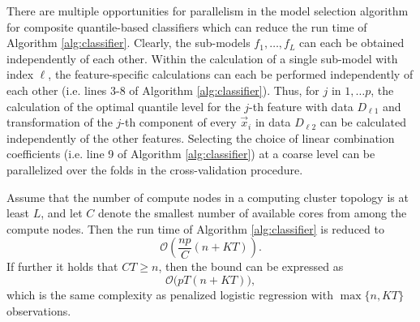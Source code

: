 There are multiple opportunities for parallelism in the model selection
algorithm for composite quantile-based classifiers which can reduce the run time
of Algorithm \ref{alg:classifier}.  Clearly, the sub-models $f_1, \dots, f_L$
can each be obtained independently of each other.  Within the calculation of a
single sub-model with index $\ell$, the feature-specific calculations can each
be performed independently of each other (i.e. lines 3-8 of Algorithm
\ref{alg:classifier}).  Thus, for $j$ in $1, \dots p$, the calculation of the
optimal quantile level for the $j$-th feature with data $D_{\ell 1}$ and
transformation of the $j$-th component of every $\vec{x}_i$ in data $D_{\ell 2}$
can be calculated independently of the other features.  Selecting the choice of
linear combination coefficients (i.e. line 9 of Algorithm \ref{alg:classifier})
at a coarse level can be parallelized over the folds in the cross-validation
procedure.

\begin{proposition}
  \label{cor:parallel-runtime}
  Assume that the number of compute nodes in a computing cluster topology is at
  least $L$, and let $C$ denote the smallest number of available cores from
  among the compute nodes.  Then the run time of Algorithm \ref{alg:classifier}
  is reduced to
  \begin{equation}
    \label{eq:parallel-runtime-ass1}
    \mathcal{O}\left(
      \frac{np}{C} (n + KT)
    \right).
  \end{equation}
  If further it holds that $CT \geq n$, then the bound can be expressed as
  \begin{equation}
    \label{eq:parallel-runtime-ass2}
    \mathcal{O}\Big(  pT (n + KT) \Big),
  \end{equation}
  which is the same complexity as penalized logistic regression with
  $\max\{n, KT\}$ observations.
\end{proposition}

